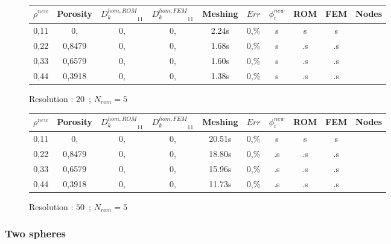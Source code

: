 {\begin{figure}[H]%
%
\begin{center}
\begin{tabular}{|c|c||c|c||c|c||c|c||c||c|}
\hline
\rowcolor{lightgray} $\rho^{new}$&Porosity&${D_k^{hom,ROM}}_{11}$&${D_k^{hom,FEM}}_{11}$&Meshing&$Err$&$\phi_i^{new}$&ROM&FEM&Nodes\\
\hline
0,11&0,&0,&0,&2.24s&0,\%&s&s&s&\\
\hline
0,22&0,8479&0,&0,&1.68s&0,\%&s&.s&.s&\\
\hline
0,33&0,6579&0,&0,&1.60s&0,\%&s&.s&.s&\\
\hline
0,44&0,3918&0,&0,&1.38s&0,\%&s&.s&.s&\\
\hline
\end{tabular}
\end{center}
\caption{Resolution : $20$\ ; $N_{rom}=5$}
%
\end{figure}

\begin{figure}[H]%
%
\begin{center}
\begin{tabular}{|c|c||c|c||c|c||c|c||c||c|}
\hline
\rowcolor{lightgray} $\rho^{new}$&Porosity&${D_k^{hom,ROM}}_{11}$&${D_k^{hom,FEM}}_{11}$&Meshing&$Err$&$\phi_i^{new}$&ROM&FEM&Nodes\\
\hline
0,11&0,&0,&0,&20.51s&0,\%&s&s&s&\\
\hline
0,22&0,8479&0,&0,&18.80s&0,\%&.s&.s&.s&\\
\hline
0,33&0,6579&0,&0,&15.96s&0,\%&.s&.s&.s&\\
\hline
0,44&0,3918&0,&0,&11.73s&0,\%&.s&.s&.s&\\
\hline
\end{tabular}
\end{center}
\caption{Resolution : $50$\ ; $N_{rom}=5$}
%
\end{figure}

\subsubsection{Two spheres}

\begin{comment}
\begin{figure}[H]
\begin{center}
\begin{tabular}{|c|c|}
\hline
\texttt{[image: ../Figures3D/ener\_vp\_2sph\_ray\_res10.png]}
&%
\texttt{[image: ../Figures3D/ener\_cumul\_vp\_2sph\_ray\_res10.png]}
\\ \hline
\end{tabular}
\end{center}
\caption{Energy of POD modes}
\end{figure}
\end{comment}

}

